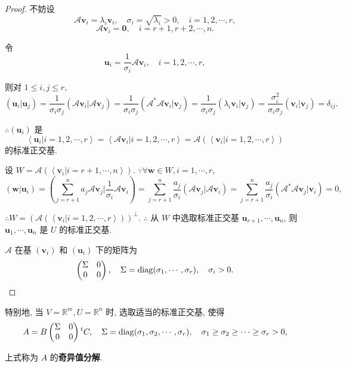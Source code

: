 \documentclass[color=black,device=normal,lang=cn,mode=geye]{elegantnote}
\begin{document}
\begin{proof}
    不妨设
    \[\mathcal{A}\boldsymbol{v}_i=\lambda_i\boldsymbol{v}_i,\quad\sigma_i=\sqrt{\lambda_i}>0,\quad i=1,2,\cdots,r,\]
    \[\mathcal{A}\boldsymbol{v}_i=\boldsymbol{0},\quad i=r+1,r+2,\cdots,n.\]

    令
    \[\boldsymbol{u}_i=\dfrac{1}{\sigma_i}\mathcal{A}\boldsymbol{v}_i,\quad i=1,2,\cdots,r,\]

    则对 $1\leq i,j\leq r$,
    \[(\boldsymbol{u}_i|\boldsymbol{u}_j)=\dfrac{1}{\sigma_i\sigma_j}(\mathcal{A}\boldsymbol{v}_i|\mathcal{A}\boldsymbol{v}_j)=\dfrac{1}{\sigma_i\sigma_j}(\mathcal{A}^*\mathcal{A}\boldsymbol{v}_i|\boldsymbol{v}_j)=\dfrac{1}{\sigma_i\sigma_j}(\lambda_i\boldsymbol{v}_i|\boldsymbol{v}_j)=\dfrac{\sigma_i^2}{\sigma_i\sigma_j}(\boldsymbol{v}_i|\boldsymbol{v}_j)=\delta_{ij}.\]

    $\therefore(\boldsymbol{u}_i)$ 是
    \[\left<\boldsymbol{u}_i|i=1,2,\cdots,r\right>=\left<\mathcal{A}\boldsymbol{v}_i|i=1,2,\cdots,r\right>=\mathcal{A}(\left<\boldsymbol{v}_i|i=1,2,\cdots,r\right>)\]
    的标准正交基.

    设 $W=\mathcal{A}(\left<\boldsymbol{v}_i|i=r+1,\cdots,n\right>)$. $\because\forall\boldsymbol{w}\in W,i=1,\cdots,r$,
    \[(\boldsymbol{w}|\boldsymbol{u}_i)=\left(\sum\limits_{j=r+1}^na_j\mathcal{A}\boldsymbol{v}_j\Bigg|\dfrac{1}{\sigma_i}\mathcal{A}\boldsymbol{v}_i\right)=\sum\limits_{j=r+1}^n\dfrac{a_j}{\sigma_i}(\mathcal{A}\boldsymbol{v}_j|\mathcal{A}\boldsymbol{v}_i)=\sum\limits_{j=r+1}^n\dfrac{a_j}{\sigma_i}(\mathcal{A}^*\mathcal{A}\boldsymbol{v}_j|\boldsymbol{v}_i)=0,\]

    $\therefore W=(\mathcal{A}(\left<\boldsymbol{v}_i|i=1,2,\cdots,r\right>))^\perp$. $\therefore$ 从 $W$ 中选取标准正交基 $\boldsymbol{u}_{r+1},\cdots,\boldsymbol{u}_n$, 则 $\boldsymbol{u}_1,\cdots,\boldsymbol{u}_n$ 是 $U$ 的标准正交基.

    $\mathcal{A}$ 在基 $(\boldsymbol{v}_i)$ 和 $(\boldsymbol{u}_i)$ 下的矩阵为
    \[\begin{pmatrix}
        \Sigma & 0 \\
        0 & 0 \\
    \end{pmatrix},\quad\Sigma=\operatorname{diag} (\sigma_1,\cdots,\sigma_r),\quad\sigma_i>0.\qedhere\]
\end{proof}
\begin{note}
    特别地, 当 $V=\mathbb{R}^m,U=\mathbb{R}^n$ 时, 选取适当的标准正交基, 使得
    \[A=B\begin{pmatrix}
        \Sigma & 0 \\
        0 & 0 \\
    \end{pmatrix}{}^tC,\quad\Sigma=\operatorname{diag} (\sigma_1,\sigma_2,\cdots,\sigma_r),\quad \sigma_1\geq\sigma_2\geq\cdots\geq\sigma_r>0,\]

    上式称为 $A$ 的\textbf{奇异值分解}.
\end{note}
\end{document}
